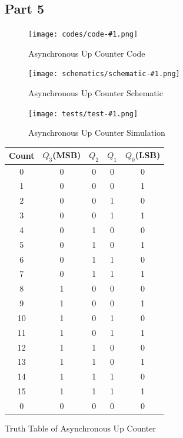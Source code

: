 \documentclass[pdftex,12pt,a4paper]{article}
\theoremstyle{plain}
\newcommand{\parts}[1]{
\begin{figure}[H]
	\centering
	\texttt{[image: codes/code-\#1.png]}
	\caption{#1 Code}
	\label{fig7}
    \end{figure}
\begin{figure}[H]
	\centering
	\texttt{[image: schematics/schematic-\#1.png]}
	\caption{#1 Schematic}
	\label{fig7}
    \end{figure}
\begin{figure}[H]
	\centering
	\texttt{[image: tests/test-\#1.png]}
	\caption{#1 Simulation}
	\label{fig7}
\end{figure}
}
\begin{document}
\subsection{Part 5}
\parts{Asynchronous Up Counter}
\begin{center}
\begin{tabular}{c | c c c c }
Count & $Q_3$(MSB) & $Q_2$ & $Q_1$ & $Q_0$(LSB) \\
\hline 
0 & 0 & 0 & 0 & 0 \\
1 & 0 & 0 & 0 & 1 \\
2 & 0 & 0 & 1 & 0 \\
3 & 0 & 0 & 1 & 1 \\
4 & 0 & 1 & 0 & 0 \\
5 & 0 & 1 & 0 & 1 \\
6 & 0 & 1 & 1 & 0 \\
7 & 0 & 1 & 1 & 1 \\
8 & 1 & 0 & 0 & 0 \\
9 & 1 & 0 & 0 & 1 \\
10 & 1 & 0 & 1 & 0 \\
11 & 1 & 0 & 1 & 1 \\
12 & 1 & 1 & 0 & 0 \\
13 & 1 & 1 & 0 & 1 \\
14 & 1 & 1 & 1 & 0 \\
15 & 1 & 1 & 1 & 1 \\
0 & 0 & 0 & 0 & 0 \\
\end{tabular}\par\vspace{1em}
 Truth Table of Asynchronous Up Counter
\end{center}
\end{document}
